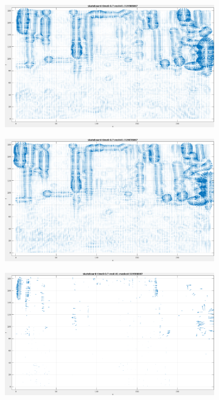 \begin{appendix}
\begin{figure}[tb]
\centering
\begin{subfigure}{.45\textwidth}
  \centering
  \includegraphics[height=.6\linewidth]{figs/skateboard/skateboard-1.png}
  \caption{}
\end{subfigure}
\begin{subfigure}{.45\textwidth}
  \centering
  \includegraphics[height=.6\linewidth]{figs/skateboard/skateboard-2.png}
  \caption{}
\end{subfigure}
\begin{subfigure}{.45\textwidth}
  \includegraphics[height=.6\linewidth]{figs/skateboard/skateboard-masked-1.png}

\end{subfigure}
\end{figure}
\end{appendix}
